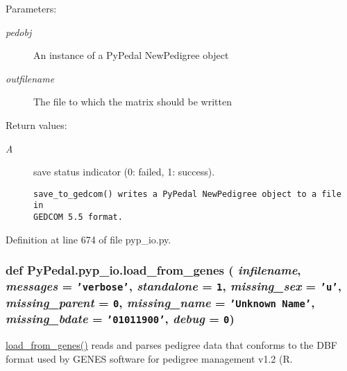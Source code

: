 \begin{Desc}
\item[Parameters:]
\begin{description}
\item[{\em pedobj}]An instance of a Py\-Pedal New\-Pedigree object \item[{\em outfilename}]The file to which the matrix should be written \end{description}
\end{Desc}
\begin{Desc}
\item[Return values:]
\begin{description}
\item[{\em A}]save status indicator (0: failed, 1: success).

\footnotesize\begin{verbatim}save_to_gedcom() writes a PyPedal NewPedigree object to a file in
GEDCOM 5.5 format.
\end{verbatim}
\normalsize
 \end{description}
\end{Desc}


Definition at line 674 of file pyp\_\-io.py.\hypertarget{namespacePyPedal_1_1pyp__io_f8605ce996a153170ed565840990ed0c}{
\subsubsection[load\_\-from\_\-genes]{\setlength{\rightskip}{0pt plus 5cm}def Py\-Pedal.pyp\_\-io.load\_\-from\_\-genes ( {\em infilename},  {\em messages} = {\tt 'verbose'},  {\em standalone} = {\tt 1},  {\em missing\_\-sex} = {\tt 'u'},  {\em missing\_\-parent} = {\tt 0},  {\em missing\_\-name} = {\tt 'Unknown~Name'},  {\em missing\_\-bdate} = {\tt '01011900'},  {\em debug} = {\tt 0})}}
\label{namespacePyPedal_1_1pyp__io_f8605ce996a153170ed565840990ed0c}


\hyperlink{namespacePyPedal_1_1pyp__io_f8605ce996a153170ed565840990ed0c}{load\_\-from\_\-genes()} reads and parses pedigree data that conforms to the DBF format used by GENES software for pedigree management v1.2 (R. 

